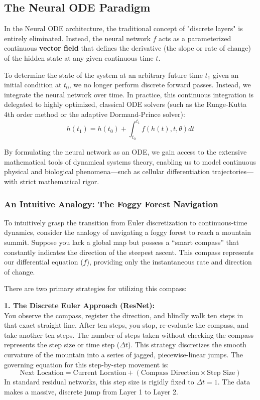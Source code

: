 \documentclass[12pt, a4paper]{article}
\begin{document}
	\subsection{The Neural ODE Paradigm}
	In the Neural ODE architecture, the traditional concept of "discrete layers" is entirely eliminated. Instead, the neural network $f$ acts as a parameterized continuous \textbf{vector field} that defines the derivative (the slope or rate of change) of the hidden state at any given continuous time $t$. 
	
	To determine the state of the system at an arbitrary future time $t_1$ given an initial condition at $t_0$, we no longer perform discrete forward passes. Instead, we integrate the neural network over time. In practice, this continuous integration is delegated to highly optimized, classical ODE solvers (such as the Runge-Kutta 4th order method or the adaptive Dormand-Prince solver):
	$$ h(t_1) = h(t_0) + \int_{t_0}^{t_1} f(h(t), t, \theta) dt $$
	
	By formulating the neural network as an ODE, we gain access to the extensive mathematical tools of dynamical systems theory, enabling us to model continuous physical and biological phenomena—such as cellular differentiation trajectories—with strict mathematical rigor.
	
	\subsubsection{An Intuitive Analogy: The Foggy Forest Navigation}
	
	To intuitively grasp the transition from Euler discretization to continuous-time dynamics, consider the analogy of navigating a foggy forest to reach a mountain summit. Suppose you lack a global map but possess a ``smart compass'' that constantly indicates the direction of the steepest ascent. This compass represents our differential equation ($f$), providing only the instantaneous rate and direction of change.
	
	There are two primary strategies for utilizing this compass:
	
	\vspace{0.3cm}
	\noindent \textbf{1. The Discrete Euler Approach (ResNet):} \\
	You observe the compass, register the direction, and blindly walk ten steps in that exact straight line. After ten steps, you stop, re-evaluate the compass, and take another ten steps. The number of steps taken without checking the compass represents the step size or time step ($\Delta t$). This strategy discretizes the smooth curvature of the mountain into a series of jagged, piecewise-linear jumps. The governing equation for this step-by-step movement is:
	$$ \text{Next Location} = \text{Current Location} + (\text{Compass Direction} \times \text{Step Size}) $$
	In standard residual networks, this step size is rigidly fixed to $\Delta t = 1$. The data makes a massive, discrete jump from Layer 1 to Layer 2.
	
\end{document}

